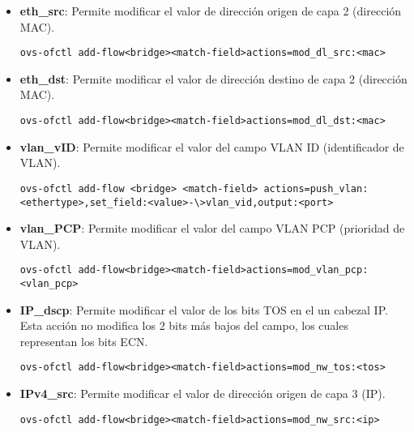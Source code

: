 \begin{itemize}

\item \textbf{eth\_src}: Permite modificar el valor de direcci\'on origen de capa 2 (direcci\'on MAC).

\begin{center}
\texttt{ovs-ofctl add-flow<bridge><match-field>actions=mod\_dl\_src:<mac>}
\end{center}

\item \textbf{eth\_dst}: Permite modificar el valor de direcci\'on destino de capa 2 (direcci\'on MAC).

\begin{center}
\texttt{ovs-ofctl add-flow<bridge><match-field>actions=mod\_dl\_dst:<mac>}
\end{center}

\item \textbf{vlan\_vID}: Permite modificar el valor del campo VLAN ID (identificador de VLAN).
                         
\begin{center}
\texttt{ovs-ofctl add-flow <bridge> <match-field> actions=push\_vlan:<ethertype>,set\_field:<value>-\textbackslash >vlan\_vid,output:<port>}
\end{center}

\item \textbf{vlan\_PCP}: Permite modificar el valor del campo VLAN PCP (prioridad de VLAN).

\begin{center}
\texttt{ovs-ofctl add-flow<bridge><match-field>actions=mod\_vlan\_pcp:<vlan\_pcp>}
\end{center}

\item \textbf{IP\_dscp}: Permite modificar el valor de los bits TOS en el un cabezal IP. Esta acci\'on no modifica los 2 bits m\'as bajos del campo, los cuales representan los bits ECN.

\begin{center}
\texttt{ovs-ofctl add-flow<bridge><match-field>actions=mod\_nw\_tos:<tos>}
\end{center}

\item \textbf{IPv4\_src}: Permite modificar el valor de direcci\'on origen de capa 3 (IP).

\begin{center}
\texttt{ovs-ofctl add-flow<bridge><match-field>actions=mod\_nw\_src:<ip>}
\end{center}


\end{itemize}
